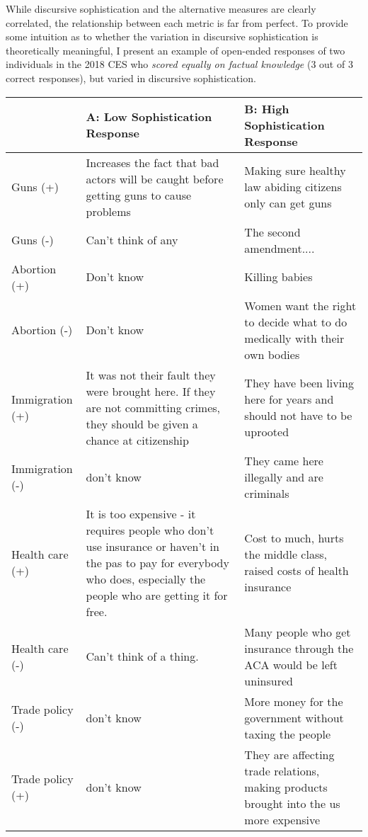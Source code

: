 While discursive sophistication and the alternative measures are clearly correlated, the relationship between each metric is far from perfect. To provide some intuition as to whether the variation in discursive sophistication is theoretically meaningful, I present an example of open-ended responses of two individuals in the 2018 CES who \textit{scored equally on factual knowledge} (3 out of 3 correct responses), but varied in discursive sophistication. 

\begin{table}[ht]\footnotesize\centering
\begin{tabular}{l|p{6.8cm}|p{5.8cm}}
\toprule
					& A: Low Sophistication Response 
					& B: High Sophistication Response
					\\\midrule
Guns (+)			& Increases the fact that bad actors will be caught before getting guns to cause problems
					& Making sure healthy law abiding citizens only can get guns
					\\\hdashline
Guns (-)			& Can't think of any
					& The second amendment....
					\\\hdashline
Abortion (+)		& Don't know
					& Killing babies
					\\\hdashline
Abortion (-)		& Don't know
					& Women want the right to decide what to do medically with their own bodies
					\\\hdashline
Immigration (+)		& It was not their fault they were brought here. If they are not committing crimes, they should be given a chance at citizenship
					& They have been living here for years and should not have to be uprooted
					\\\hdashline
Immigration (-)		& don't know
					& They came here illegally and are criminals
					\\\hdashline
Health care (+)		& It is too expensive - it requires people who don't use insurance or haven't in the pas to pay for everybody who does, especially the people who are getting it for free.
					& Cost to much, hurts the middle class, raised costs of health insurance
					\\\hdashline
Health care (-)		& Can't think of a thing.
					& Many people who get insurance through the ACA would be left uninsured
					\\\hdashline
Trade policy (-)	& don't know
					& More money for the government without taxing the people
					\\\hdashline
Trade policy (+)	& don't know
					& They are affecting trade relations, making products brought into the us more expensive

\end{tabular}
\end{table}
